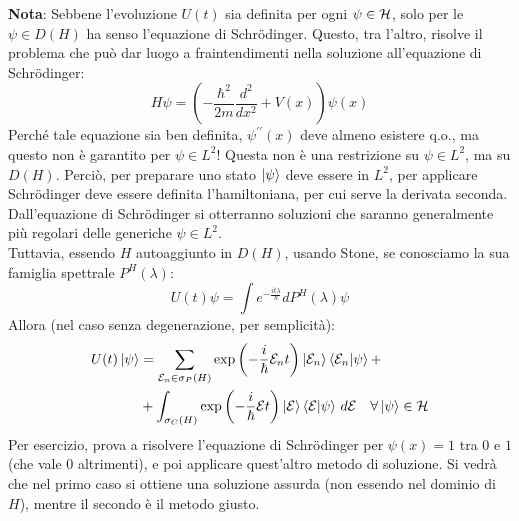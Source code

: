 \documentclass[../../FisicaTeorica.tex]{subfiles}
\begin{document}
\textbf{Nota}: Sebbene l'evoluzione $U(t)$ sia definita per ogni $\psi \in \mathcal{H}$, solo per le $\psi \in D(H)$ ha senso l'equazione di Schrödinger. Questo, tra l'altro, risolve il problema che può dar luogo a fraintendimenti nella soluzione all'equazione di Schrödinger:
\[
	H\psi =\left(-\frac{\hbar^2}{2m}\frac{d^2}{dx^2}+V\left(x\right)\right)\psi \left(x\right)
\]
	Perché tale equazione sia ben definita, $\psi^{\prime\prime}(x)$ deve almeno esistere q.o., ma questo non è garantito per $\psi \in L^2$! Questa non è una restrizione su $\psi \in L^2$, ma su $D(H)$. Perciò, per preparare uno stato $\ket{\psi}$ deve essere in $L^2$, per applicare Schrödinger deve essere definita l'hamiltoniana, per cui serve la derivata seconda. Dall'equazione di Schrödinger si otterranno soluzioni che saranno generalmente più regolari delle generiche $\psi \in L^2$.\\
	Tuttavia, essendo $H$ autoaggiunto in $D\left(H\right)$, usando Stone, se conosciamo la sua famiglia spettrale $P^H\left(\lambda\right)$:
	\[
	U\left(t\right)\psi =\int e^{-\frac{it\lambda}{\hbar}}dP^H\left(\lambda\right)\psi 
	\]
	Allora (nel caso senza degenerazione, per semplicità):
	\begin{align}
	U(t)\ket{\psi} &= \sum_{\mathcal{E}_n \in \sigma_P(H)} \exp\left (-\frac{i}{\hbar}\mathcal{E}_n t\right) \ket{\mathcal{E}_n}\braket{\mathcal{E}_n |\psi} +\\
	&+ 
	\int_{\sigma_C(H)} \exp\left(-\frac{i}{\hbar}\mathcal{E}t\right ) \ket{\mathcal{E}}\braket{\mathcal{E}|\psi}\, d\mathcal{E} \quad \forall \ket{\psi}\in \mathcal{H}
	\label{eqn:evoluzionetemporale_nodeg}
	\end{align}
Per esercizio, prova a risolvere l'equazione di Schrödinger per $\psi \left(x\right)=1$ tra $0$ e $1$ (che vale $0$ altrimenti), e poi applicare quest'altro metodo di soluzione. Si vedrà che nel primo caso si ottiene una soluzione assurda (non essendo nel dominio di $H$), mentre il secondo è il metodo giusto.
\end{document}

